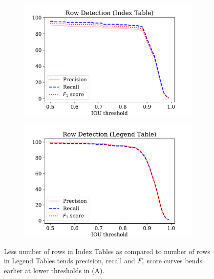 \begin{figure}[h!]
\centering
\begin{subfigure}{0.48\linewidth}
  \centering
  \includegraphics[width=\linewidth]{row_index_pRf.pdf}
    \caption{}
    \label{}
\end{subfigure}
\begin{subfigure}{0.48\linewidth}
  \centering
  \includegraphics[width=\linewidth]{row_legend_pRf.pdf}
    \caption{}
    \label{}
\end{subfigure}
\caption{Less number of rows in Index Tables as compared to number of rows in Legend Tables tends precision, recall and $F_1$ score curves bends earlier at lower thresholds in (A).}
\label{fig:row_index_legend_graph}
\end{figure}

